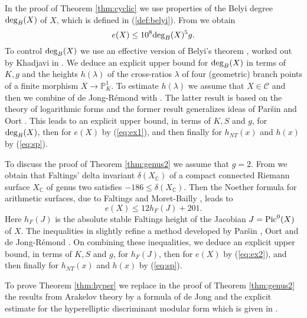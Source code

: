 \documentclass[11pt]{article}
\numberwithin{equation}{section}
\def\deg{\textnormal{deg}}
\newcommand {\CC}  {{\mathbb C}}
\newcommand {\br} {\lambda}
\begin{document}
In the proof of Theorem \ref{thm:cyclic} we use properties of the Belyi degree $\deg_B(X)$ of $X$, which is defined in (\ref{def:belyi}). From \cite[Theorem 1.1.1]{javanpeykar:belyi} we obtain
\begin{equation}\label{eq:ex1}
e(X)\leq 10^8\deg_B(X)^5g.
\end{equation}
To control $\deg_B(X)$ we use an effective version  of Belyi's theorem \cite{belyi:theorem}, worked out by Khadjavi in \cite{khadjavi:belyi}. We deduce an explicit upper bound for $\deg_B(X)$ in terms of $K,g$ and the heights $h(\br)$ of the cross-ratios $\br$ of four (geometric) branch points of a finite morphism $X\to\mathbb P^1_K$. 
To estimate $h(\br)$ we assume that $X\in\mathcal C$ and then we combine  \cite[Proposition 2.1]{jore:shafarevich} of de Jong-R\'emond with \cite[Proposition 6.1 (ii)]{rvk:szpiro}. 
The latter result is based on the theory of logarithmic forms and the former result generalizes ideas of Par{\v{s}}in \cite{parshin:shafarevich} and Oort \cite{oort:shafarevich}. 
This leads to an explicit upper bound, in terms of $K,S$ and $g$, for $\deg_B(X)$, then for $e(X)$ by (\ref{eq:ex1}), and then finally for $h_{NT}(x)$ and $h(x)$ by (\ref{eq:sp}). 

To discuss the proof of Theorem \ref{thm:genus2} we assume that $g=2$. From \cite[Proposition 5.1 (v)]{rvk:szpiro} we obtain that Faltings' delta invariant $\delta(X_\CC)$ of a compact connected Riemann surface $X_\CC$ of genus two satisfies $-186\leq \delta(X_\CC).$ Then the Noether formula  for arithmetic surfaces, due to Faltings \cite{faltings:arithmeticsurfaces}  and Moret-Bailly \cite{moba:noether}, leads to 
\begin{equation}\label{eq:ex2}
e(X)\leq 12h_F(J)+201.
\end{equation}
Here $h_F(J)$ is the absolute stable Faltings height of the Jacobian $J=\textnormal{Pic}^0(X)$ of $X$. 
The inequalities in \cite[Proposition 4.1 (i), Proposition 6.1 (ii)]{rvk:szpiro} slightly refine a method developed by Par{\v{s}}in \cite{parshin:shafarevich}, Oort \cite{oort:shafarevich} and de Jong-R\'emond \cite{jore:shafarevich}. On combining these inequalities, we deduce an explicit upper bound, in terms of $K,S$ and $g$, for $h_F(J)$, then for $e(X)$ by (\ref{eq:ex2}), and then finally for $h_{NT}(x)$ and $h(x)$ by (\ref{eq:sp}). 

To prove Theorem \ref{thm:hyper} we replace in the proof of Theorem \ref{thm:genus2} the results from Arakelov theory by a formula of de Jong \cite[Theorem 4.3]{dejong:weierstrasspoints} and the explicit estimate  for the hyperelliptic discriminant modular form which is given in \cite[Lemma 5.4]{rvk:szpiro}. 
\end{document}
